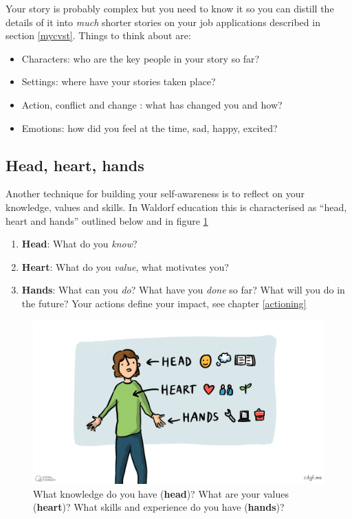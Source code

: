 \documentclass[
]{book}
\providecommand{\tightlist}{%
  \setlength{\itemsep}{0pt}\setlength{\parskip}{0pt}}
\begin{document}
Your story is probably complex but you need to know it so you can distill the details of it into \emph{much} shorter stories on your job applications described in section \ref{mycvst}. Things to think about are:

\begin{itemize}
\tightlist
\item
  Characters: who are the key people in your story so far?
\item
  Settings: where have your stories taken place?
\item
  Action, conflict and change : what has changed you and how?
\item
  Emotions: how did you feel at the time, sad, happy, excited?
\end{itemize}

\hypertarget{hhh}{%
\subsection{Head, heart, hands}\label{hhh}}

Another technique for building your self-awareness is to reflect on your knowledge, values and skills. In Waldorf education this is characterised as ``head, heart and hands'' outlined below and in figure \ref{fig:headhearthands-fig} \citep{headhearthands}

\begin{enumerate}
\def\labelenumi{\arabic{enumi}.}
\tightlist
\item
  \textbf{Head}: What do you \emph{know}?
\item
  \textbf{Heart}: What do you \emph{value}, what motivates you?
\item
  \textbf{Hands}: What can you \emph{do}? What have you \emph{done} so far? What will you do in the future? Your actions define your impact, see chapter \ref{actioning}
\end{enumerate}

\begin{figure}

{\centering \includegraphics[width=1\linewidth]{images/Head, heart and hands} 

}

\caption{What knowledge do you have (\textbf{head})? What are your values (\textbf{heart})? What skills and experience do you have (\textbf{hands})?}\label{fig:headhearthands-fig}
\end{figure}
\end{document}
